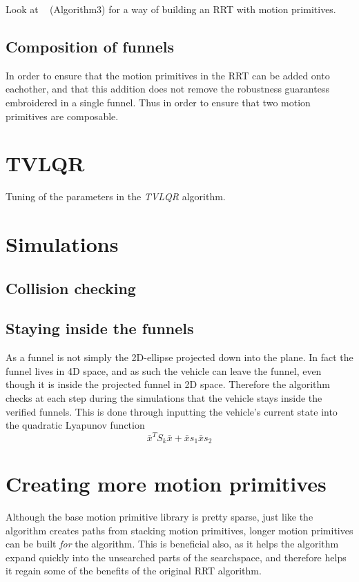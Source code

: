 Look at ~\cite{vonasekGlobalMotionPlanning2013} (Algorithm3) for a way of
building an RRT with motion primitives.

\subsection{Composition of funnels}

In order to ensure that the motion primitives in the \ac{RRT} can be added onto
eachother, and that this addition does not remove the robustness guarantess
embroidered in a single funnel. Thus in order to ensure that two motion
primitives are composable.

\section{TVLQR}

Tuning of the parameters in the \textit{TVLQR} algorithm.

\section{Simulations}

\subsection{Collision checking}

\subsection{Staying inside the funnels}

As a funnel is not simply the 2D-ellipse projected down into the plane. In fact
the funnel lives in 4D space, and as such the vehicle can leave the funnel, even
though it is inside the projected funnel in 2D space. Therefore the \rrtfunnel{}
algorithm checks at each step during the simulations that the vehicle stays
inside the verified funnels. This is done through inputting the vehicle's
current state into the quadratic Lyapunov function
\[
  {\bar{x}}^{T}S_{k}\bar{x} + \bar{x}s_{1} \bar{x} s_{2}
\]

\section{Creating more motion primitives}

Although the base motion primitive library is pretty sparse, just like the
\rrtfunnel{} algorithm creates paths from stacking motion primitives, longer
motion primitives can be built \textit{for} the \rrtfunnel{} algorithm. This is
beneficial also, as it helps the algorithm expand quickly into the unsearched
parts of the searchspace, and therefore helps it regain some of the benefits of
the original \ac{RRT} algorithm.

